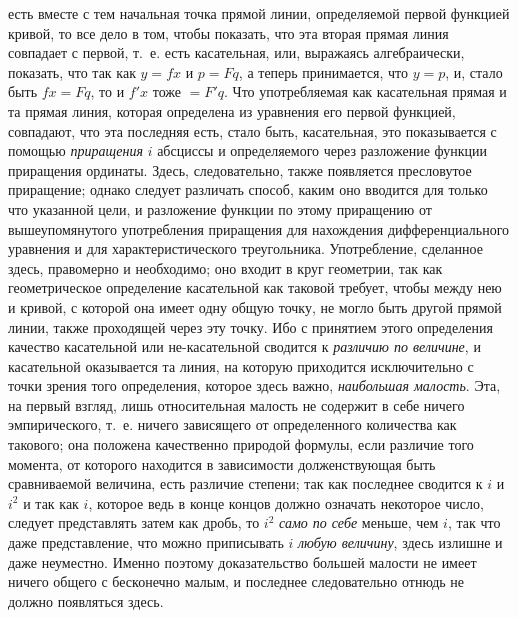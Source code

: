 есть вместе с тем начальная точка прямой линии, определяемой первой
функцией кривой, то все дело в том, чтобы показать, что эта вторая прямая
линия совпадает с первой, т.~е. есть касательная, или, выражаясь
алгебраически, показать, что так как $y=fx$ и $p=Fq$,
а теперь принимается, что $y=p$, и, стало быть $fx=Fq$,
то и $f'x$ тоже $=F'q$. Что употребляемая как касательная прямая и та
прямая линия, которая определена из уравнения его первой функцией,
совпадают, что эта последняя есть, стало быть, касательная, это
показывается с помощью {\em приращения}
$i$ абсциссы и определяемого через разложение
функции приращения ординаты. Здесь, следовательно, также появляется
пресловутое приращение; однако следует различать способ, каким оно вводится
для только что указанной цели, и разложение функции по этому приращению от
вышеупомянутого употребления приращения для нахождения дифференциального
уравнения и для характеристического треугольника. Употребление, сделанное
здесь, правомерно и необходимо; оно входит в круг геометрии, так как
геометрическое определение касательной как таковой требует, чтобы между нею
и кривой, с которой она имеет одну общую точку, не могло быть другой прямой
линии, также проходящей через эту точку. Ибо с принятием этого определения
качество касательной или не-касательной сводится к
{\em различию по величине}, и касательной оказывается
та линия, на которую приходится исключительно с точки зрения того
определения, которое здесь важно, {\em наибольшая
малость}. Эта, на первый взгляд, лишь относительная малость не содержит в
себе ничего эмпирического, т.~е. ничего зависящего от определенного
количества как такового; она положена качественно природой формулы, если
различие того момента, от которого находится в зависимости долженствующая
быть сравниваемой величина, есть различие степени; так как последнее
сводится к $i$ и $i^{2}$ и так как $i$, которое ведь в конце концов должно
означать некоторое число, следует представлять затем как дробь, то $i^{2}$
{\em само по себе} меньше, чем $i$, так что даже представление, что можно
приписывать $i$ {\em любую величину}, здесь
излишне и даже неуместно. Именно поэтому доказательство
большей малости не имеет ничего общего с бесконечно малым, и последнее
следовательно отнюдь не должно появляться здесь.

